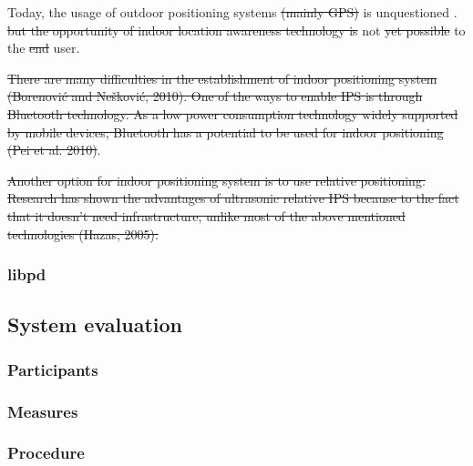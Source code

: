 
Today, the usage of outdoor positioning systems \st{(mainly GPS)} is unquestioned .  \st{but the opportunity of indoor location awareness technology is} not \st{yet possible}  to the \st{end}  user.


\st{There are many difficulties in the establishment of indoor positioning system (Borenović and Nešković, 2010). One of the ways to enable IPS is through Bluetooth technology. As a low power consumption technology widely supported by mobile devices, Bluetooth has a potential to be used for indoor positioning (Pei et al. 2010)}.

\st{Another option for indoor positioning system is to use relative positioning. Research has shown the advantages of ultrasonic relative IPS because to the fact that it doesn’t need infrastructure, unlike most of the above mentioned technologies (Hazas, 2005).}

\subsubsection{libpd}

\subsection{System evaluation}


\subsubsection{Participants}

\subsubsection{Measures}

\subsubsection{Procedure}